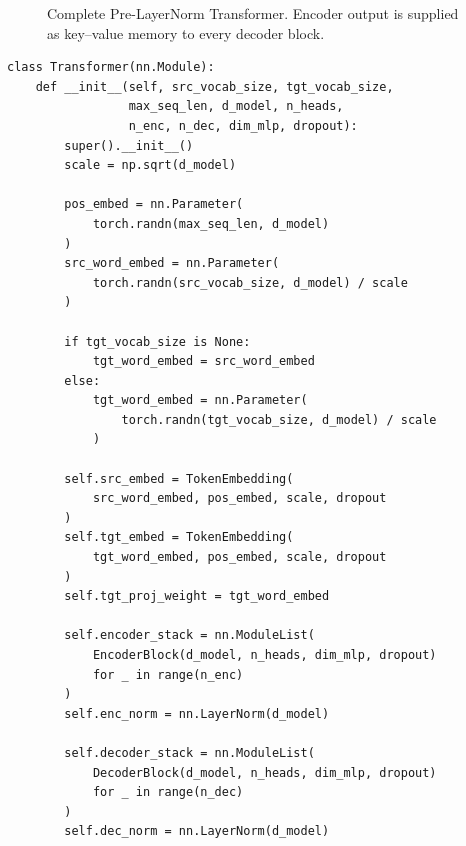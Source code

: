 \documentclass[11pt]{article}
\begin{document}
\begin{figure}[htbp]
\centering
{}
\caption{Complete Pre-LayerNorm Transformer. Encoder output is supplied as key--value memory to every decoder block.}
\label{fig:transformer}
\end{figure}

\begin{lstlisting}[caption={Transformer initialization.},label={lst:transformer_init}]
class Transformer(nn.Module):
    def __init__(self, src_vocab_size, tgt_vocab_size,
                 max_seq_len, d_model, n_heads,
                 n_enc, n_dec, dim_mlp, dropout):
        super().__init__()
        scale = np.sqrt(d_model)

        pos_embed = nn.Parameter(
            torch.randn(max_seq_len, d_model)
        )
        src_word_embed = nn.Parameter(
            torch.randn(src_vocab_size, d_model) / scale
        )

        if tgt_vocab_size is None:
            tgt_word_embed = src_word_embed
        else:
            tgt_word_embed = nn.Parameter(
                torch.randn(tgt_vocab_size, d_model) / scale
            )

        self.src_embed = TokenEmbedding(
            src_word_embed, pos_embed, scale, dropout
        )
        self.tgt_embed = TokenEmbedding(
            tgt_word_embed, pos_embed, scale, dropout
        )
        self.tgt_proj_weight = tgt_word_embed

        self.encoder_stack = nn.ModuleList(
            EncoderBlock(d_model, n_heads, dim_mlp, dropout)
            for _ in range(n_enc)
        )
        self.enc_norm = nn.LayerNorm(d_model)

        self.decoder_stack = nn.ModuleList(
            DecoderBlock(d_model, n_heads, dim_mlp, dropout)
            for _ in range(n_dec)
        )
        self.dec_norm = nn.LayerNorm(d_model)
\end{lstlisting}
\end{document}
